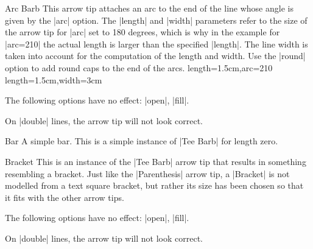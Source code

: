 \begin{arrowtip}{Arc Barb}{
    This arrow tip attaches an arc to the end of the line whose angle is given
    by the |arc| option. The |length| and |width| parameters refer to the size
    of the arrow tip for |arc| set to 180 degrees, which is why in the example
    for |arc=210| the actual length is larger than the specified |length|. The
    line width is taken into account for the computation  of the length and
    width. Use the |round| option to add round caps to the end of the arcs.
}%
{length=1.5cm,arc=210}%
{length=1.5cm,width=3cm}

    \begin{arrowexamples}
        \arrowexample[]
        \arrowexampledup[sep]
        \arrowexampledupdot[sep]
        \arrowexample[arc=120]
        \arrowexample[arc=270]
        \arrowexample[length=2pt]
        \arrowexample[length=2pt,width=5pt]
        \arrowexample[line width=2pt]
        \arrowexample[reversed]
        \arrowexample[round]
        \arrowexample[slant=.3]
        \arrowexample[left]
        \arrowexample[right]
        \arrowexample[red]
    \end{arrowexamples}
    The following options have no effect: |open|, |fill|.

    On |double| lines, the arrow tip will not look correct.
\end{arrowtip}

\begin{arrowtipsimple}{Bar}
    A simple bar. This is a simple instance of |Tee Barb| for length zero.
\end{arrowtipsimple}

\begin{arrowtip}{Bracket}{
    This is an instance of the |Tee Barb| arrow tip that results in something
    resembling a bracket. Just like the |Parenthesis| arrow tip, a |Bracket| is
    not modelled from a text square bracket, but rather its size has been
    chosen so that it fits with the other arrow tips.
}%
{}%
{}

    \begin{arrowexamples}
        \arrowexample[]
        \arrowexampledup[sep]
        \arrowexampledupdot[sep]
        \arrowexample[reversed]
        \arrowexample[round]
        \arrowexample[slant=.3]
        \arrowexample[left]
        \arrowexample[right]
        \arrowexample[red]
    \end{arrowexamples}
    The following options have no effect: |open|, |fill|.

    On |double| lines, the arrow tip will not look correct.
\end{arrowtip}

